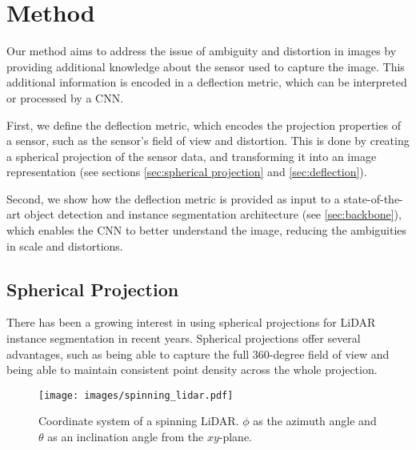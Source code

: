 \section{\large Method}
\label{sec_method}
Our method aims to address the issue of ambiguity and distortion in images by providing additional knowledge about the sensor used to capture the image. This additional information is encoded in a deflection metric, which can be interpreted or processed by a CNN.

First, we define the deflection metric, which encodes the projection properties of a sensor, such as the sensor's field of view and distortion. This is done by creating a spherical projection of the sensor data, and transforming it into an image representation (see sections \autoref{sec:spherical projection} and \ref{sec:deflection}).

Second, we show how the deflection metric is provided as input to a state-of-the-art object detection and instance segmentation architecture (see \autoref{sec:backbone}), which enables the CNN to better understand the image, reducing the ambiguities in scale and distortions.


\subsection{Spherical Projection}
\label{sec:spherical projection}
There has been a growing interest in using spherical projections for LiDAR instance segmentation in recent years. Spherical projections offer several advantages, such as being able to capture the full 360-degree field of view and being able to maintain consistent point density across the whole projection.

\begin{figure}[!h] 
    \centering
    \texttt{[image: images/spinning\_lidar.pdf]}
    \caption{Coordinate system of a spinning LiDAR. $\phi$ as the azimuth angle and $\theta$ as an inclination angle from the $xy$-plane.}
    \label{fig:spinning_lidar}
\end{figure}

